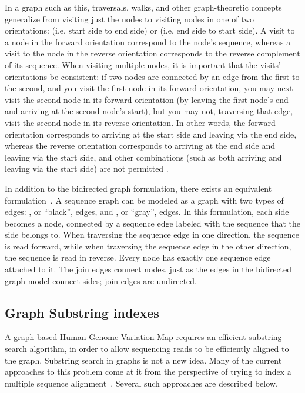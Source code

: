 In a graph such as this, traversals, walks, and other graph-theoretic concepts generalize from visiting just the nodes to visiting nodes in one of two orientations:  (i.e. start side to end side) or  (i.e. end side to start side). A visit to a node in the forward orientation correspond to the node's sequence, whereas a visit to the node in the reverse orientation corresponds to the reverse complement of its sequence. When visiting multiple nodes, it is important that the visits' orientations be consistent: if two nodes are connected by an edge from the first to the second, and you visit the first node in its forward orientation, you may next visit the second node in its forward orientation (by leaving the first node's end and arriving at the second node's start), but you may not, traversing that edge, visit the second node in its reverse orientation. In other words, the forward orientation corresponds to arriving at the start side and leaving via the end side, whereas the reverse orientation corresponds to arriving at the end side and leaving via the start side, and other combinations (such as both arriving and leaving via the start side) are not permitted \cite{bodily2016scaffoldscaffolder}.

In addition to the bidirected graph formulation, there exists an equivalent  formulation~\cite{paten2017superbubbles}. A sequence graph can be modeled as a graph with two types of edges: , or ``black'', edges, and , or ``gray'', edges. In this formulation, each side becomes a node, connected by a sequence edge labeled with the sequence that the side belongs to. When traversing the sequence edge in one direction, the sequence is read forward, while when traversing the sequence edge in the other direction, the sequence is read in reverse. Every node has exactly one sequence edge attached to it. The join edges connect nodes, just as the edges in the bidirected graph model connect sides; join edges are undirected.


\subsection{Graph Substring indexes}

A graph-based Human Genome Variation Map requires an efficient substring search algorithm, in order to allow sequencing reads to be efficiently aligned to the graph. Substring search in graphs is not a new idea. Many of the current approaches to this problem come at it from the perspective of trying to index a multiple sequence alignment~\cite{siren2014indexing}. Several such approaches are described below.


